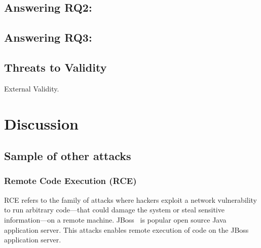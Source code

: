 \documentclass[sigconf,review, anonymous]{acmart}
\begin{document}
\subsection{Answering RQ2: \textRQtwo}
\label{sec:answer-rqtwo}

\subsection{Answering RQ3: \textRQthree}
\label{sec:answer-rqthree}


\subsection{Threats to Validity}
\label{sec:threats}

External Validity. 


\section{Discussion}

\subsection{Sample of other attacks}

\subsubsection{Remote Code Execution (RCE)}
\label{sec:rce}
\label{sec:jboss}
\label{sec:content-example}


RCE refers to the family of attacks where hackers exploit a network
vulnerability to run arbitrary code---that could damage the system or
steal sensitive information---on a remote machine. JBoss~\cite{jboss}
is popular open source Java application server. This attacks enables
remote execution of code on the JBoss application server.

\end{document}
